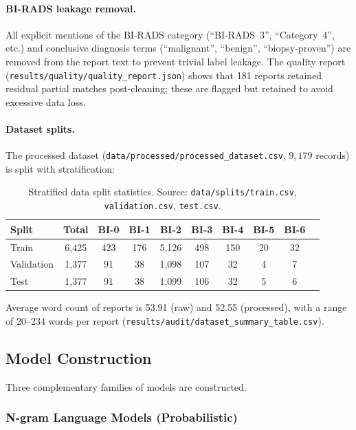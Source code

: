 \documentclass[11pt,a4paper]{article}
\begin{document}
\paragraph{BI-RADS leakage removal.}
All explicit mentions of the BI-RADS category (``BI-RADS~3'', ``Category~4'',
etc.) and conclusive diagnosis terms (``malignant'', ``benign'',
``biopsy-proven'') are removed from the report text to prevent trivial
label leakage.
The quality report (\texttt{results/quality/quality\_report.json}) shows that
181 reports retained residual partial matches post-cleaning; these are flagged
but retained to avoid excessive data loss.

\paragraph{Dataset splits.}
The processed dataset (\texttt{data/processed/processed\_dataset.csv},
$9{,}179$ records) is split with stratification:

\begin{table}[h!]
\centering
\caption{Stratified data split statistics.
         Source: \texttt{data/splits/train.csv}, \texttt{validation.csv},
         \texttt{test.csv}.}
\label{tab:splits}
\begin{tabular}{lccccccccc}
\toprule
\textbf{Split} & \textbf{Total} &
  \textbf{BI-0} & \textbf{BI-1} & \textbf{BI-2} &
  \textbf{BI-3} & \textbf{BI-4} & \textbf{BI-5} & \textbf{BI-6} \\
\midrule
Train      & 6{,}425 & 423 & 176 & 5{,}126 & 498 & 150 & 20 & 32 \\
Validation & 1{,}377 & 91  & 38  & 1{,}098 & 107 & 32  & 4  & 7  \\
Test       & 1{,}377 & 91  & 38  & 1{,}099 & 106 & 32  & 5  & 6  \\
\bottomrule
\end{tabular}
\end{table}

Average word count of reports is 53.91 (raw) and 52.55 (processed),
with a range of 20--234 words per report
(\texttt{results/audit/dataset\_summary\_table.csv}).

\subsection{Model Construction}

Three complementary families of models are constructed.

\subsubsection{N-gram Language Models (Probabilistic)}
\end{document}
